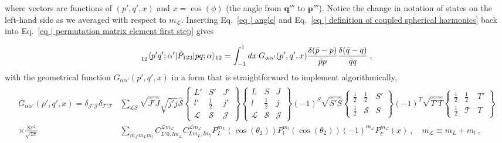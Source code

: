 \documentclass[aps,prc,showpacs,twocolumn,floatfix,nobibnotes,nofootinbib,amsmath,amssymb,longbibliography]{revtex4-2}
\begin{document}
where vectors are functions of $(p',q',x)$ and $x=\cos(\phi)$ (the
angle from $\bm{q}'''$ to $\bm{p}'''$). Notice the change in notation
of states on the left-hand side as we averaged with respect to $m_{\mathcal{L}}$. Inserting
Eq.~\eqref{eq | angle} and Eq.~\eqref{eq | definition of coupled
  spherical harmonics} back into Eq.~\eqref{eq | permutation matrix
  element first step} gives
\begin{widetext}
\begin{equation}
	\prescript{}{12}{\langle}p'q';\alpha'|\hat{P}_{123}|pq;\alpha\rangle_{12} = \int_{-1}^1 dx\: G_{\alpha\alpha'}(p',q',x) \frac{\delta(\bar{p}-p)}{\bar{p}p}\frac{\delta(\bar{q}-q)}{\bar{q}q} \:,
	\label{eq | permutation matrix analytical expression}
\end{equation}
with the geometrical function $G_{\alpha\alpha'}(p',q',x)$ in a form that is straightforward to implement algorithmically,
\begin{align}
	\begin{split}
	 G_{\alpha\alpha'}(p',q',x)= \delta_{\mathcal{J}'\mathcal{J}}\delta_{\mathcal{T}'\mathcal{T}}&\sum_{\mathcal{L}\mathcal{S}}\sqrt{\hat{J}'\hat{J}}\sqrt{\hat{j}'\hat{j}}
	\hat{\mathcal{S}}\begin{Bmatrix}
	L' & S' & J' \\
	l' & \frac{1}{2} & j' \\
	\mathcal{L} & \mathcal{S} & \mathcal{J}
	\end{Bmatrix}
	\begin{Bmatrix}
	L & S & J \\
	l & \frac{1}{2} & j \\
	\mathcal{L} & \mathcal{S} & \mathcal{J}
	\end{Bmatrix}
	(-1)^{S}\sqrt{\hat{S}'\hat{S}}
	\begin{Bmatrix}
	\frac{1}{2} & \frac{1}{2} & S' \\
	\frac{1}{2} & \mathcal{S} & S
	\end{Bmatrix}(-1)^{T}\sqrt{\hat{T}'\hat{T}}
	\begin{Bmatrix}
	\frac{1}{2} & \frac{1}{2} & T' \\
	\frac{1}{2} & \mathcal{T} & T
	\end{Bmatrix} \\
	\times\frac{8\pi^2}{\sqrt{4\pi}}
	&\sum_{m_{\mathcal{L}}m_Lm_l} C_{L'0,lm_{\mathcal{L}}}^{\mathcal{L}m_{\mathcal{L}}}C_{Lm_L,lm_l}^{\mathcal{L}m_{\mathcal{L}}} P_L^{m_L}(\cos(\theta_1))P_l^{m_l}(\cos(\theta_2))(-1)^{m_{\mathcal{L}}}P_{l'}^{m_{\mathcal{L}}}(x) \:,\quad m_{\mathcal{L}}\equiv m_L+m_l \:,\\
	\end{split}
	\label{eq | geometric function}
\end{align}
\end{widetext}
\end{document}
